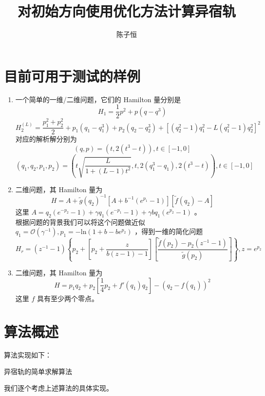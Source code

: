 \documentclass[]{article}
\title{对初始方向使用优化方法计算异宿轨}
\author{陈子恒}
\begin{document}
\maketitle

\section{目前可用于测试的样例}
\begin{enumerate}
	\item 一个简单的一维/二维问题，它们的 Hamilton 量分别是
	$$
	H_1 = \dfrac{1}{2} p^2 + p(q - q^3)
	$$
	$$
	H_2^{(L)} = \dfrac{p_1^2 + p_2^2}{2} + p_1(q_1 - q_1^3) + p_2(q_2 - q_2^3) + \left[(q_2^2-1)q_1^2-L(q_1^2-1)q_2^2\right]^2
	$$
	对应的解析解分别为
	$$
	(q, p) = (t, 2(t^3 - t)), t \in [-1, 0]
	$$
	$$
	(q_1, q_2, p_1, p_2) = \left(t \sqrt{\dfrac{L}{1+(L-1)t^2}}, t, 2(q_1^3-q_1), 2(t^3-t)\right), t \in [-1, 0]
	$$
	\item 二维问题，其 Hamilton 量为
	$$
	H = A + \tilde{g}(q_2)^{−1} [A + b^{-1} (e^{p_1} − 1)] [\tilde{f}(q_2) − A]
	$$
	这里 $A = q_2(e^{−p_2} − 1) + \gamma q_1(e^{−p_1} − 1) + \gamma bq_1(e^{p_2} − 1)$ 。 \\
	根据问题的背景我们可以将这个问题做近似 $q_1 = \mathcal{O}(\gamma ^{−1}), p_1 = −\text{ln}(1 + b − b e^{p_2})$ ，得到一维的简化问题
	$$
	H_r = (z^{-1}-1) \left\{p_2 + \left[p_2 + \dfrac{z}{b(z-1)-1}\right] \left[\dfrac{\tilde{f}(p_2) - p_2(z^{-1}-1)}{\tilde{g}(p_2)}\right]\right\}, z = e^{p_2}
	$$
	\item 二维问题，其 Hamilton 量为
	$$
	H = p_1q_2 + p_2\left[\dfrac{1}{4}p_2+f'(q_1)q_2\right] - (q_2-f(q_1))^2
	$$
	这里 $f$ 具有至少两个零点。
\end{enumerate}

\section{算法概述}
算法实现如下：

\begin{algorithm}[H]
\caption{异宿轨的简单求解算法}
\end{algorithm}
我们逐个考虑上述算法的具体实现。
\end{document}
